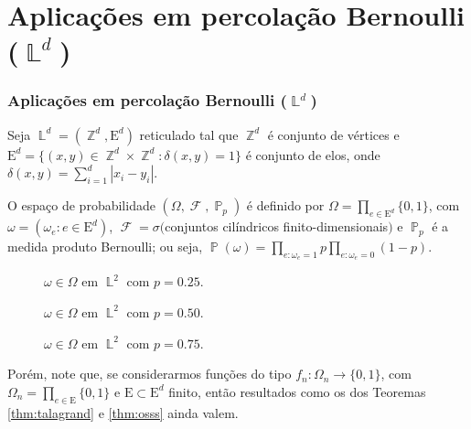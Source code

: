 \documentclass[9pt]{beamer}
\theoremstyle{definition} %
\DeclareMathOperator{\PX}{\mathbb{P}} %
\DeclareMathOperator{\FX}{\mathcal{F}} %
\DeclareMathOperator{\ZX}{\mathbb{Z}} %
\DeclareMathOperator{\LX}{\mathbb{L}} %
\begin{document}
	\section{Aplicações em percolação Bernoulli ($\LX^d$)}
	\begin{frame}[t]
		\frametitle{Aplicações em percolação Bernoulli ($\LX^d$)}
		Seja $\LX^d = (\ZX^d, \text{E}^d)$ reticulado tal que $\ZX^d$ é conjunto de vértices e $\text{E}^d = \{(x, y) \in \ZX^d \times \ZX^d : \delta(x, y) = 1\}$ é conjunto de elos, onde $\delta(x, y) = \sum_{i = 1}^{d} |x_i - y_i|$.
		\pause
		
		O espaço de probabilidade $(\Omega, \FX, \PX_p)$ é definido por $\Omega = \prod_{e \in \text{E}^d}\{0, 1\}$, com $\omega = (\omega_e : e \in \text{E}^d)$, $\FX = \sigma($conjuntos cilíndricos finito-dimensionais$)$ e $\PX_p$ é a medida produto Bernoulli; ou seja, $\PX(\omega) = \prod_{e:\omega_e = 1}p \prod_{e:\omega_e = 0}(1-p)$.
		\vspace{-3pt}	
		\begin{figure}
			\begin{overprint}
				\centering
				\centering
				\centering
			\end{overprint}
		\vspace{-9pt} 
			\begin{overprint}
				\caption{$\omega \in \Omega$ em $\LX^2$ com $p = 0.25$.}
				\caption{$\omega \in \Omega$ em $\LX^2$ com $p = 0.50$.}
				\caption{$\omega \in \Omega$ em $\LX^2$ com $p = 0.75$.}
			\end{overprint}
			\label{fig-reticulado}
		\end{figure}		
		\vspace{-12pt}
		\pause
		\pause
		\pause
		Porém, note que, se considerarmos funções do tipo $f_n: \Omega_n \to \{0, 1\}$, com $\Omega_n = \prod_{e \in \text{E}}\{0, 1\}$ e $\text{E} \subset \text{E}^d$ finito, então resultados como os dos Teoremas \ref{thm:talagrand} e \ref{thm:osss} ainda valem.
	\end{frame}
\end{document}
